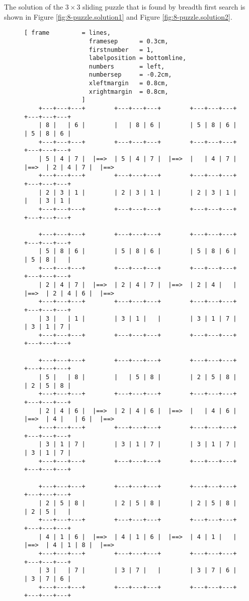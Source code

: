The solution of the $3 \times 3$ sliding puzzle that is found by breadth first search is shown in
Figure \ref{fig:8-puzzle.solution1} and Figure \ref{fig:8-puzzle.solution2}.

\begin{figure}[!ht]
\centering
\begin{Verbatim}[ frame         = lines, 
                  framesep      = 0.3cm, 
                  firstnumber   = 1,
                  labelposition = bottomline,
                  numbers       = left,
                  numbersep     = -0.2cm,
                  xleftmargin   = 0.8cm,
                  xrightmargin  = 0.8cm,
                ]
    +---+---+---+        +---+---+---+        +---+---+---+        +---+---+---+
    | 8 |   | 6 |        |   | 8 | 6 |        | 5 | 8 | 6 |        | 5 | 8 | 6 |
    +---+---+---+        +---+---+---+        +---+---+---+        +---+---+---+
    | 5 | 4 | 7 |  |==>  | 5 | 4 | 7 |  |==>  |   | 4 | 7 |  |==>  | 2 | 4 | 7 |  |==>
    +---+---+---+        +---+---+---+        +---+---+---+        +---+---+---+
    | 2 | 3 | 1 |        | 2 | 3 | 1 |        | 2 | 3 | 1 |        |   | 3 | 1 |
    +---+---+---+        +---+---+---+        +---+---+---+        +---+---+---+

    +---+---+---+        +---+---+---+        +---+---+---+        +---+---+---+
    | 5 | 8 | 6 |        | 5 | 8 | 6 |        | 5 | 8 | 6 |        | 5 | 8 |   |
    +---+---+---+        +---+---+---+        +---+---+---+        +---+---+---+
    | 2 | 4 | 7 |  |==>  | 2 | 4 | 7 |  |==>  | 2 | 4 |   |  |==>  | 2 | 4 | 6 |  |==>
    +---+---+---+        +---+---+---+        +---+---+---+        +---+---+---+
    | 3 |   | 1 |        | 3 | 1 |   |        | 3 | 1 | 7 |        | 3 | 1 | 7 |
    +---+---+---+        +---+---+---+        +---+---+---+        +---+---+---+

    +---+---+---+        +---+---+---+        +---+---+---+        +---+---+---+
    | 5 |   | 8 |        |   | 5 | 8 |        | 2 | 5 | 8 |        | 2 | 5 | 8 |
    +---+---+---+        +---+---+---+        +---+---+---+        +---+---+---+
    | 2 | 4 | 6 |  |==>  | 2 | 4 | 6 |  |==>  |   | 4 | 6 |  |==>  | 4 |   | 6 |  |==>
    +---+---+---+        +---+---+---+        +---+---+---+        +---+---+---+
    | 3 | 1 | 7 |        | 3 | 1 | 7 |        | 3 | 1 | 7 |        | 3 | 1 | 7 |
    +---+---+---+        +---+---+---+        +---+---+---+        +---+---+---+

    +---+---+---+        +---+---+---+        +---+---+---+        +---+---+---+
    | 2 | 5 | 8 |        | 2 | 5 | 8 |        | 2 | 5 | 8 |        | 2 | 5 |   |
    +---+---+---+        +---+---+---+        +---+---+---+        +---+---+---+
    | 4 | 1 | 6 |  |==>  | 4 | 1 | 6 |  |==>  | 4 | 1 |   |  |==>  | 4 | 1 | 8 |  |==>
    +---+---+---+        +---+---+---+        +---+---+---+        +---+---+---+
    | 3 |   | 7 |        | 3 | 7 |   |        | 3 | 7 | 6 |        | 3 | 7 | 6 |
    +---+---+---+        +---+---+---+        +---+---+---+        +---+---+---+


\end{Verbatim}
\end{figure}
